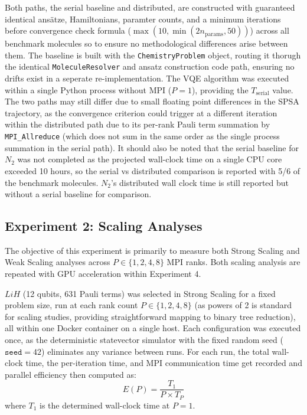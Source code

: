Both paths, the serial baseline and distributed, are constructed with guaranteed identical ansätze, Hamiltonians, paramter counts, and a minimum iterations before convergence check formula ($\max(10, \min(2n_{\text{params}}, 50))$) across all benchmark molecules
so to ensure no methodological differences arise between them. The baseline is built with the \texttt{ChemistryProblem} object, routing 
it thorugh the identical \texttt{MoleculeResolver} and ansatz construction code path, ensuring no drifts exist in a seperate re-implementation. The VQE algorithm was executed within 
a single Python process without MPI ($P=1$), providing the $T_{\text{serial}}$ value. The two paths may still 
differ due to small floating point differences in the SPSA trajectory, as the convergence criterion could trigger at a different iteration 
within the distributed path due to its per-rank Pauli term summation by \texttt{MPI_Allreduce} (which does
not sum in the same order as the single process summation in the serial path). It should also be noted that the serial baseline for $N_2$
was not completed as the projected wall-clock time on a single CPU core exceeded 10 hours, so the serial vs distributed comparison is reported with 5/6 of the 
benchmark molecules. $N_2$'s distributed wall clock time is still reported but without a serial baseline for comparison. 


\subsection{Experiment 2: Scaling Analyses}
The objective of this experiment is primarily to measure both Strong Scaling and Weak Scaling analyses across  $P \in \{1,2,4,8\}$ MPI ranks. 
Both scaling analysis are repeated with GPU acceleration within Experiment 4.

$LiH$ (12 qubits, 631 Pauli terms) was selected in Strong Scaling for a fixed problem size, run at each rank 
count $P \in \{1,2,4,8\}$ (as powers of 2 is standard for scaling studies, providing straightforward mapping to binary tree reduction), all within one Docker container on a single host. 
Each configuration was executed once, as the deterministic statevector simulator with the fixed 
random seed ($\texttt{seed}=42$) eliminates any variance between runs. For each run, the total 
wall-clock time, the per-iteration time, and MPI communication time get recorded and parallel efficiency then computed as:
\begin{equation}
    E(P) = \frac{T_1}{P \times T_P}
\end{equation}
where $T_1$ is the determined wall-clock time at $P= 1$.

